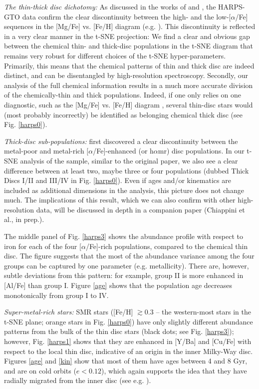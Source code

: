 \documentclass{aa}  %
\begin{document}
{\it The thin-thick disc dichotomy:} As discussed in the works of \citet{Adibekyan2011, Adibekyan2012} and \citet{DelgadoMena2017}, the HARPS-GTO data confirm the clear discontinuity between the high- and the low-[$\alpha$/Fe] sequences in the [Mg/Fe] vs. [Fe/H] diagram (e.g. \citealt{Edvardsson1993, Gratton1996, Fuhrmann1998, Fuhrmann2011, Fuhrmann2017}). This discontinuity is reflected in a very clear manner in the t-SNE projection:
We find a clear and obvious gap between the chemical thin- and thick-disc populations in the t-SNE diagram that remains very robust for different choices of the t-SNE hyper-parameters. Primarily, this means that the chemical patterns of thin and thick disc are indeed distinct, and can be disentangled by high-resolution spectroscopy. Secondly, our analysis of the full chemical information results in a much more accurate division of the chemically-thin and thick populations. Indeed, if one only relies on one diagnostic, such as the [Mg/Fe] vs. [Fe/H] diagram \citep{Adibekyan2011, DelgadoMena2017}, several thin-disc stars would (most probably incorrectly) be identified as belonging chemical thick disc (see Fig. \ref{harps0}).

{\it Thick-disc sub-populations:} \citet{Adibekyan2011} first discovered a clear discontinuity between the metal-poor and metal-rich $[\alpha$/Fe]-enhanced (or h$\alpha$mr) disc populations. In our t-SNE analysis of the \citet{DelgadoMena2017} sample, similar to the original paper, we also see a clear difference between at least two, maybe three or four populations (dubbed Thick Discs I/II and III/IV in Fig. \ref{harps0}). Even if ages and/or kinematics are included as additional dimensions in the analysis, this picture does not change much. The implications of this result, which we can also confirm with other high-resolution data, will be discussed in depth in a companion paper (Chiappini et al., in prep.).

The middle panel of Fig. \ref{harps3} shows the abundance profile with respect to iron for each of the four [$\alpha$/Fe]-rich populations, compared to the chemical thin disc. The figure suggests that the most of the abundance variance among the four groups can be captured by one parameter (e.g. metallicity). There are, however, subtle deviations from this pattern: for example, group II is more enhanced in [Al/Fe] than group I. Figure \ref{age} shows that the population age decreases monotonically from group I to IV. 

{\it Super-metal-rich stars:} SMR stars ([Fe/H] $\gtrsim0.3$ -- the western-most stars in the t-SNE plane; orange stars in Fig. \ref{harps0}) have only slightly different abundance patterns from the bulk of the thin disc stars (black dots; see Fig. \ref{harps3}); however, Fig. \ref{harps1} shows that they are enhanced in [Y/Ba] and [Cu/Fe] with respect to the local thin disc, indicative of an origin in the inner Milky-Way disc. Figures \ref{age} and \ref{kin} show that most of them have ages between 4 and 8 Gyr, and are on cold orbits ($e<0.12$), which again supports the idea that they have radially migrated from the inner disc (see e.g. \citealt{Casagrande2011, Minchev2012, Vera-Ciro2014, Kordopatis2015, Grand2016, Anders2017}).
\end{document}
